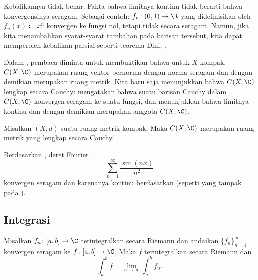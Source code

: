 Kebalikannya tidak benar. Fakta bahwa limitnya kontinu tidak berarti
bahwa konvergensinya seragam. Sebagai contoh:
$f_n \colon (0,1) \to \R$ yang didefinisikan oleh $f_n(x) \coloneqq x^n$ konvergen ke
fungsi nol, tetapi tidak secara seragam. Namun, jika kita menambahkan syarat-syarat tambahan
pada barisan tersebut, kita dapat memperoleh kebalikan parsial seperti teorema Dini,
.

Dalam , pembaca diminta untuk membuktikan
bahwa untuk $X$ kompak, $C(X,\C)$ merupakan ruang vektor bernorma
dengan norma seragam dan dengan demikian merupakan ruang metrik. Kita baru saja menunjukkan bahwa
$C(X,\C)$ lengkap secara Cauchy:  mengatakan bahwa suatu barisan Cauchy
dalam $C(X,\C)$ konvergen seragam ke suatu fungsi,
dan  menunjukkan bahwa limitnya
kontinu dan dengan demikian merupakan anggota $C(X,\C)$.

\begin{cor}
Misalkan $(X,d)$ suatu ruang metrik kompak.
Maka $C(X,\C)$ merupakan ruang metrik yang lengkap secara Cauchy.
\end{cor}

\begin{example}
Berdasarkan ,
deret Fourier
\begin{equation*}
\sum_{n=1}^\infty \frac{\sin(nx)}{n^2}
\end{equation*}
konvergen seragam dan karenanya kontinu berdasarkan  (seperti yang tampak
pada ).
\end{example}

\subsection{Integrasi}

\begin{prop} \label{prop:complexlimitswapintegral}
Misalkan $f_n \colon [a,b] \to \C$
terintegralkan secara Riemann dan andaikan $\{ f_n \}_{n=1}^\infty$ konvergen
seragam ke $f \colon [a,b] \to \C$. Maka $f$ terintegralkan secara Riemann
dan
\begin{equation*}
\int_a^b f = \lim_{n\to \infty} \int_a^b f_n .
\end{equation*}
\end{prop}

